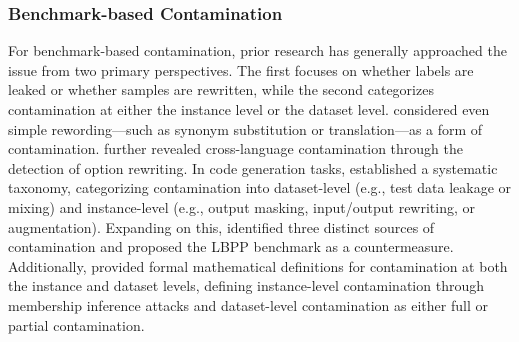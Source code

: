 \subsubsection{Benchmark-based Contamination}

For benchmark-based contamination, prior research has generally approached the issue from two primary perspectives. The first focuses on whether labels are leaked or whether samples are rewritten, while the second categorizes contamination at either the instance level or the dataset level. \citet{yang2023rethinkingbenchmarkcontaminationlanguage} considered even simple rewording—such as synonym substitution or translation—as a form of contamination. \citet{yao-etal-2024-data} further revealed cross-language contamination through the detection of option rewriting. In code generation tasks, \citet{palavalli-etal-2024-taxonomy} established a systematic taxonomy, categorizing contamination into dataset-level (e.g., test data leakage or mixing) and instance-level (e.g., output masking, input/output rewriting, or augmentation). Expanding on this, \citet{matton-etal-2024-leakage} identified three distinct sources of contamination and proposed the LBPP benchmark as a countermeasure. Additionally, \citet{fu2024does} provided formal mathematical definitions for contamination at both the instance and dataset levels, defining instance-level contamination through membership inference attacks and dataset-level contamination as either full or partial contamination.

